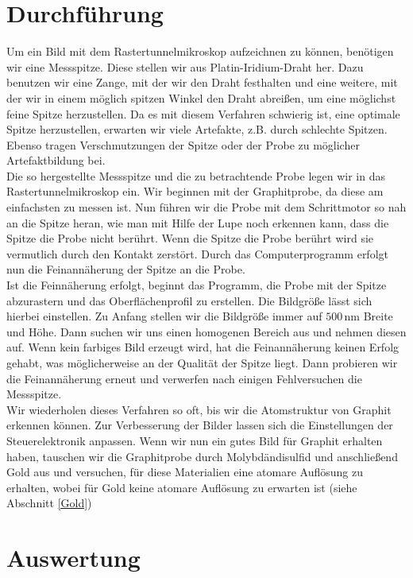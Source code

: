 \documentclass[12pt,listof=totoc]{scrartcl}
\begin{document}
\newpage
\section{Durchführung}\label{durchfuehrung}
Um ein Bild mit dem Rastertunnelmikroskop aufzeichnen zu können, benötigen wir eine Messspitze. Diese stellen wir aus Platin-Iridium-Draht her. Dazu benutzen wir eine Zange, mit der wir den Draht festhalten und eine weitere, mit der wir in einem möglich spitzen Winkel den Draht abreißen, um eine möglichst feine Spitze herzustellen. Da es mit diesem Verfahren schwierig ist, eine optimale Spitze herzustellen, erwarten wir viele Artefakte, z.B. durch schlechte Spitzen. Ebenso tragen Verschmutzungen der Spitze oder der Probe zu möglicher Artefaktbildung bei.\\

Die so hergestellte Messspitze und die zu betrachtende Probe legen wir in das Rastertunnelmikroskop ein. Wir beginnen mit der Graphitprobe, da diese am einfachsten zu messen ist. Nun führen wir die Probe mit dem Schrittmotor so nah an die Spitze heran, wie man mit Hilfe der Lupe noch erkennen kann, dass die Spitze die Probe nicht berührt. Wenn die Spitze die Probe berührt wird sie vermutlich durch den Kontakt zerstört. Durch das Computerprogramm erfolgt nun die Feinannäherung der Spitze an die Probe. \\

Ist die Feinnäherung erfolgt, beginnt das Programm, die Probe mit der Spitze abzurastern und das Oberflächenprofil zu erstellen. Die Bildgröße lässt sich hierbei einstellen. Zu Anfang stellen wir die Bildgröße immer auf $500\,$nm Breite und Höhe. Dann suchen wir uns einen homogenen Bereich  aus und nehmen diesen auf. Wenn kein farbiges Bild erzeugt wird, hat die Feinannäherung keinen Erfolg gehabt, was möglicherweise an der Qualität der Spitze liegt. Dann probieren wir die Feinannäherung erneut und verwerfen nach einigen Fehlversuchen die Messspitze.\\

Wir wiederholen dieses Verfahren so oft, bis wir die Atomstruktur von Graphit erkennen können. Zur Verbesserung der Bilder lassen sich die Einstellungen der Steuerelektronik anpassen. Wenn wir nun ein gutes Bild für Graphit erhalten haben, tauschen wir die Graphitprobe durch Molybdändisulfid und anschließend Gold aus und versuchen, für diese Materialien eine atomare Auflösung zu erhalten, wobei für Gold keine atomare Auflösung zu erwarten ist (siehe Abschnitt \ref{Gold})\newpage
\section{Auswertung}
\end{document}
